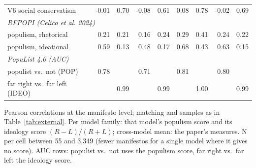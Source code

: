 \begin{table}[ht]
{\begin{tabular}{lrrrrrrrr}
\quad V6 social conservatism & -0.01 & 0.70 & -0.08 & 0.61 & 0.08 & 0.78 & -0.02 & 0.69 \\
\multicolumn{9}{l}{\emph{RFPOPI (Celico et al. 2024)}} \\
\quad populism, rhetorical & 0.21 & 0.21 & 0.16 & 0.24 & 0.29 & 0.41 & 0.24 & 0.22 \\
\quad populism, ideational & 0.59 & 0.13 & 0.48 & 0.17 & 0.68 & 0.43 & 0.63 & 0.15 \\
\multicolumn{9}{l}{\emph{PopuList 4.0 (AUC)}} \\
\quad populist vs.\ not (POP) & 0.78 &  & 0.71 &  & 0.81 &  & 0.80 &  \\
\quad far right vs.\ far left (IDEO) &  & 0.99 &  & 0.99 &  & 1.00 &  & 0.99 \\
\bottomrule
\end{tabular}}
\par\smallskip
\begin{minipage}{\linewidth}\scriptsize Pearson correlations at the manifesto level; matching and samples as in Table~\ref{tab:external}. Per model family: that model's populism score and its ideology score $(R-L)/(R+L)$; cross-model mean: the paper's measures. N per cell between 55 and 3,349 (fewer manifestos for a single model where it gives no score). AUC rows: populist vs.\ not uses the populism score, far right vs.\ far left the ideology score.\end{minipage}
\end{table}

